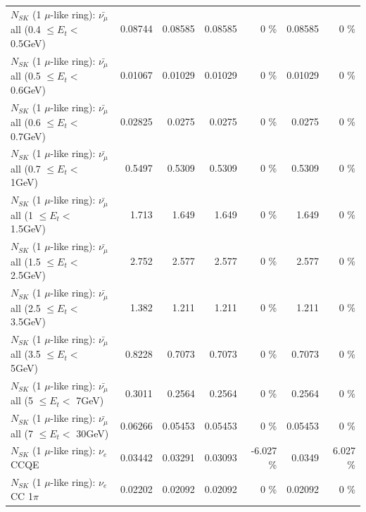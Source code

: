 \begin{table}
\begin{tabular}{| l | r | r | r  r | r  r |}
 $N_{SK}$ (1 $\mu$-like ring): $\bar{\nu_{\mu}}$ all (0.4 $\leq E_{t} <$ 0.5GeV) &         0.08744 &         0.08585 &         0.08585 &        0 \%  &         0.08585 &        0 \%  \\ 
 $N_{SK}$ (1 $\mu$-like ring): $\bar{\nu_{\mu}}$ all (0.5 $\leq E_{t} <$ 0.6GeV) &         0.01067 &         0.01029 &         0.01029 &        0 \%  &         0.01029 &        0 \%  \\ 
 $N_{SK}$ (1 $\mu$-like ring): $\bar{\nu_{\mu}}$ all (0.6 $\leq E_{t} <$ 0.7GeV) &         0.02825 &          0.0275 &          0.0275 &        0 \%  &          0.0275 &        0 \%  \\ 
   $N_{SK}$ (1 $\mu$-like ring): $\bar{\nu_{\mu}}$ all (0.7 $\leq E_{t} <$ 1GeV) &          0.5497 &          0.5309 &          0.5309 &        0 \%  &          0.5309 &        0 \%  \\ 
   $N_{SK}$ (1 $\mu$-like ring): $\bar{\nu_{\mu}}$ all (1 $\leq E_{t} <$ 1.5GeV) &           1.713 &           1.649 &           1.649 &        0 \%  &           1.649 &        0 \%  \\ 
 $N_{SK}$ (1 $\mu$-like ring): $\bar{\nu_{\mu}}$ all (1.5 $\leq E_{t} <$ 2.5GeV) &           2.752 &           2.577 &           2.577 &        0 \%  &           2.577 &        0 \%  \\ 
 $N_{SK}$ (1 $\mu$-like ring): $\bar{\nu_{\mu}}$ all (2.5 $\leq E_{t} <$ 3.5GeV) &           1.382 &           1.211 &           1.211 &        0 \%  &           1.211 &        0 \%  \\ 
   $N_{SK}$ (1 $\mu$-like ring): $\bar{\nu_{\mu}}$ all (3.5 $\leq E_{t} <$ 5GeV) &          0.8228 &          0.7073 &          0.7073 &        0 \%  &          0.7073 &        0 \%  \\ 
     $N_{SK}$ (1 $\mu$-like ring): $\bar{\nu_{\mu}}$ all (5 $\leq E_{t} <$ 7GeV) &          0.3011 &          0.2564 &          0.2564 &        0 \%  &          0.2564 &        0 \%  \\ 
    $N_{SK}$ (1 $\mu$-like ring): $\bar{\nu_{\mu}}$ all (7 $\leq E_{t} <$ 30GeV) &         0.06266 &         0.05453 &         0.05453 &        0 \%  &         0.05453 &        0 \%  \\ 
\hline
\hline
\hline
                                      $N_{SK}$ (1 $\mu$-like ring): $\nu_e$ CCQE &         0.03442 &         0.03291 &         0.03093 &   -6.027 \%  &          0.0349 &    6.027 \%  \\ 
                                 $N_{SK}$ (1 $\mu$-like ring): $\nu_e$ CC 1$\pi$ &         0.02202 &         0.02092 &         0.02092 &        0 \%  &         0.02092 &        0 \%  \\ 

\end{tabular}
\end{table}
